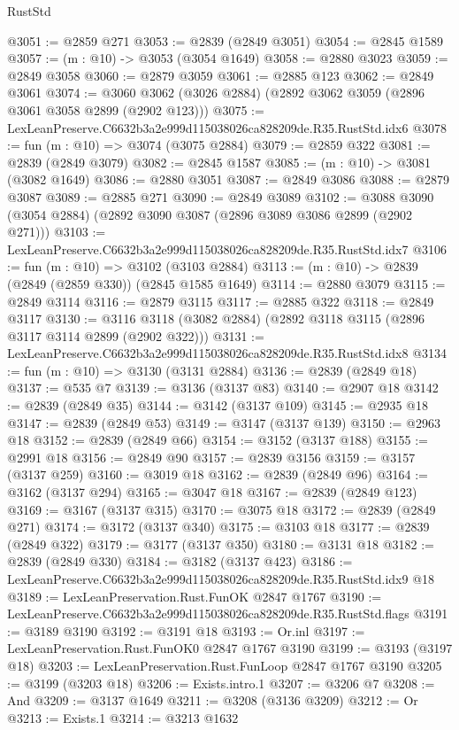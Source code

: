 \begin{lexlean}{RustStd}
\begin{coremodule}
@3051 := @2859 @271
@3053 := @2839 (@2849 @3051)
@3054 := @2845 @1589
@3057 := (m : @10) -> @3053 (@3054 @1649)
@3058 := @2880 @3023
@3059 := @2849 @3058
@3060 := @2879 @3059
@3061 := @2885 @123
@3062 := @2849 @3061
@3074 := @3060 @3062 (@3026 @2884) (@2892 @3062 @3059 (@2896 @3061 @3058 @2899 (@2902 @123)))
@3075 := LexLeanPreserve.C6632b3a2e999d115038026ca828209de.R35.RustStd.idx6
@3078 := fun (m : @10) => @3074 (@3075 @2884)
@3079 := @2859 @322
@3081 := @2839 (@2849 @3079)
@3082 := @2845 @1587
@3085 := (m : @10) -> @3081 (@3082 @1649)
@3086 := @2880 @3051
@3087 := @2849 @3086
@3088 := @2879 @3087
@3089 := @2885 @271
@3090 := @2849 @3089
@3102 := @3088 @3090 (@3054 @2884) (@2892 @3090 @3087 (@2896 @3089 @3086 @2899 (@2902 @271)))
@3103 := LexLeanPreserve.C6632b3a2e999d115038026ca828209de.R35.RustStd.idx7
@3106 := fun (m : @10) => @3102 (@3103 @2884)
@3113 := (m : @10) -> @2839 (@2849 (@2859 @330)) (@2845 @1585 @1649)
@3114 := @2880 @3079
@3115 := @2849 @3114
@3116 := @2879 @3115
@3117 := @2885 @322
@3118 := @2849 @3117
@3130 := @3116 @3118 (@3082 @2884) (@2892 @3118 @3115 (@2896 @3117 @3114 @2899 (@2902 @322)))
@3131 := LexLeanPreserve.C6632b3a2e999d115038026ca828209de.R35.RustStd.idx8
@3134 := fun (m : @10) => @3130 (@3131 @2884)
@3136 := @2839 (@2849 @18)
@3137 := @535 @7
@3139 := @3136 (@3137 @83)
@3140 := @2907 @18
@3142 := @2839 (@2849 @35)
@3144 := @3142 (@3137 @109)
@3145 := @2935 @18
@3147 := @2839 (@2849 @53)
@3149 := @3147 (@3137 @139)
@3150 := @2963 @18
@3152 := @2839 (@2849 @66)
@3154 := @3152 (@3137 @188)
@3155 := @2991 @18
@3156 := @2849 @90
@3157 := @2839 @3156
@3159 := @3157 (@3137 @259)
@3160 := @3019 @18
@3162 := @2839 (@2849 @96)
@3164 := @3162 (@3137 @294)
@3165 := @3047 @18
@3167 := @2839 (@2849 @123)
@3169 := @3167 (@3137 @315)
@3170 := @3075 @18
@3172 := @2839 (@2849 @271)
@3174 := @3172 (@3137 @340)
@3175 := @3103 @18
@3177 := @2839 (@2849 @322)
@3179 := @3177 (@3137 @350)
@3180 := @3131 @18
@3182 := @2839 (@2849 @330)
@3184 := @3182 (@3137 @423)
@3186 := LexLeanPreserve.C6632b3a2e999d115038026ca828209de.R35.RustStd.idx9 @18
@3189 := LexLeanPreservation.Rust.FunOK @2847 @1767
@3190 := LexLeanPreserve.C6632b3a2e999d115038026ca828209de.R35.RustStd.flags
@3191 := @3189 @3190
@3192 := @3191 @18
@3193 := Or.inl
@3197 := LexLeanPreservation.Rust.FunOK0 @2847 @1767 @3190
@3199 := @3193 (@3197 @18)
@3203 := LexLeanPreservation.Rust.FunLoop @2847 @1767 @3190
@3205 := @3199 (@3203 @18)
@3206 := Exists.intro.{1}
@3207 := @3206 @7
@3208 := And
@3209 := @3137 @1649
@3211 := @3208 (@3136 @3209)
@3212 := Or
@3213 := Exists.{1}
@3214 := @3213 @1632

\end{coremodule}
\end{lexlean}
